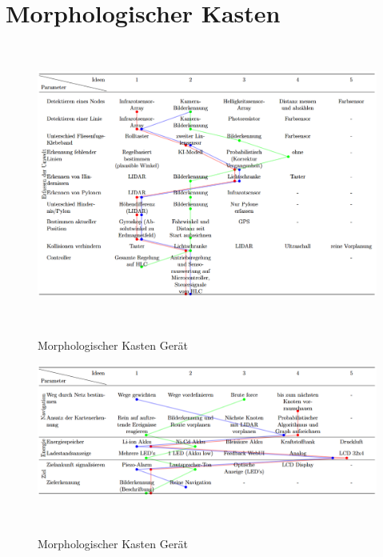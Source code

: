 \documentclass[main.tex]{subfiles} %
\begin{document}

\section{Morphologischer Kasten}~\label{appendix:Morpologischer_Kasten}

\begin{figure}[h]
    \centering
    \includegraphics[width=1\textwidth]{./fig_Morphologischer_Kasten/Morphologischer_Kasten_1.png}
    \caption{Morphologischer Kasten Gerät}~\label{fig:Morphologischer_Kasten_1}
\end{figure}

\begin{figure}[h]
    \centering
    \includegraphics[width=1\textwidth]{./fig_Morphologischer_Kasten/Morphologischer_Kasten_2.png}
    \caption{Morphologischer Kasten Gerät}~\label{fig:Morphologischer_Kasten_2}
\end{figure}

\newpage
\end{document}
